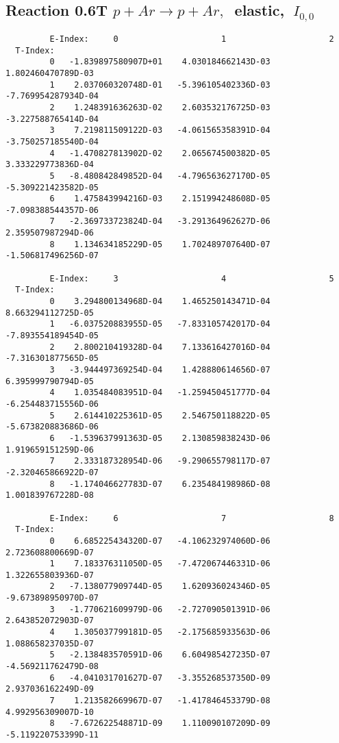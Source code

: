 \documentclass[12pt,dvipdfmx]{article}
\begin{document}
\subsection{
Reaction 0.6T  $p + Ar \rightarrow p + Ar ,\ $
 elastic, $\  I_{0,0}$
}

\begin{small}\begin{verbatim}
         E-Index:     0                     1                     2
  T-Index:
         0   -1.839897580907D+01    4.030184662143D-03    1.802460470789D-03
         1    2.037060320748D-01   -5.396105402336D-03   -7.769954287934D-04
         2    1.248391636263D-02    2.603532176725D-03   -3.227588765414D-04
         3    7.219811509122D-03   -4.061565358391D-04   -3.750257185540D-04
         4   -1.470827813902D-02    2.065674500382D-05    3.333229773836D-04
         5   -8.480842849852D-04   -4.796563627170D-05   -5.309221423582D-05
         6    1.475843994216D-03    2.151994248608D-05   -7.098388544357D-06
         7   -2.369733723824D-04   -3.291364962627D-06    2.359507987294D-06
         8    1.134634185229D-05    1.702489707640D-07   -1.506817496256D-07

         E-Index:     3                     4                     5
  T-Index:
         0    3.294800134968D-04    1.465250143471D-04    8.663294112725D-05
         1   -6.037520883955D-05   -7.833105742017D-04   -7.893554189454D-05
         2    2.800210419328D-04    7.133616427016D-04   -7.316301877565D-05
         3   -3.944497369254D-04    1.428880614656D-07    6.395999790794D-05
         4    1.035484083951D-04   -1.259450451777D-04   -6.254483715556D-06
         5    2.614410225361D-05    2.546750118822D-05   -5.673820883686D-06
         6   -1.539637991363D-05    2.130859838243D-06    1.919659151259D-06
         7    2.333187328954D-06   -9.290655798117D-07   -2.320465866922D-07
         8   -1.174046627783D-07    6.235484198986D-08    1.001839767228D-08

         E-Index:     6                     7                     8
  T-Index:
         0    6.685225434320D-07   -4.106232974060D-06    2.723608800669D-07
         1    7.183376311050D-05   -7.472067446331D-06    1.322655803936D-07
         2   -7.138077909744D-05    1.620936024346D-05   -9.673898950970D-07
         3   -1.770621609979D-06   -2.727090501391D-06    2.643852072903D-07
         4    1.305037799181D-05   -2.175685933563D-06    1.088658237035D-07
         5   -2.138483570591D-06    6.604985427235D-07   -4.569211762479D-08
         6   -4.041031701627D-07   -3.355268537350D-09    2.937036162249D-09
         7    1.213582669967D-07   -1.417846453379D-08    4.992956309007D-10
         8   -7.672622548871D-09    1.110090107209D-09   -5.119220753399D-11
\end{verbatim}\end{small}
\end{document}
